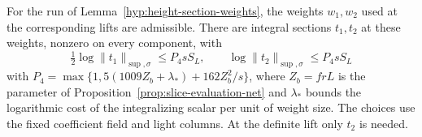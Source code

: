 \begin{proposition}\label{prop:height-complementary-sections}
For the run of Lemma~\ref{hyp:height-section-weights}, the weights \(w_1,w_2\) used at the
corresponding lifts are admissible. There are integral
sections \(t_1,t_2\) at these weights, nonzero on every
component, with
\[
  \tfrac12\log\|t_1\|_{\sup,\sigma}\le P_4 sS_L,\qquad
              \log\|t_2\|_{\sup,\sigma}\le P_4 sS_L
\]
with \(P_4=\max\{1,5(1009Z_b+\lambda_*)+162 Z_b^2/s\}\),
where \(Z_b=frL\) is the parameter of Proposition~\ref{prop:slice-evaluation-net} and
\(\lambda_*\) bounds the logarithmic cost of the integralizing scalar
per unit of weight size. The choices use the fixed
coefficient field and light columns. At the definite lift
only \(t_2\) is needed.
\end{proposition}

